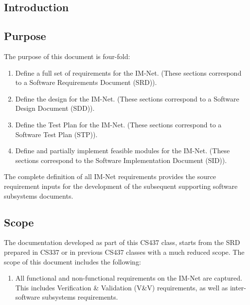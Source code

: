 \documentclass[letterpaper,12pt]{article}
\begin{document}
\tableofcontents
\listoffigures

\eject

{\textcolor{section}{\section{Introduction}}

\textcolor{subsection}{\subsection{Purpose}}

The purpose of this document is four-fold:

\begin{enumerate}
\item  Define a full set of requirements for the IM-Net. (These sections correspond to a Software Requirements Document (SRD)).

\item  Define the design for the IM-Net. (These sections correspond to a Software Design Document (SDD)).

\item  Define the Test Plan for the IM-Net. (These sections correspond to a Software Test Plan (STP)).

\item  Define and partially implement feasible modules for the IM-Net.  (These sections correspond to the Software Implementation Document (SID)).
\end{enumerate}

The complete definition of all IM-Net requirements provides the source requirement inputs for the development of the subsequent supporting software subsystems documents.

\textcolor{subsection}{\subsection{Scope}}

The documentation developed as part of this CS437 class, starts from the SRD prepared in CS337 or in previous CS437 classes with a much reduced scope.  The scope of this document includes the following:

\begin{enumerate}
\item  All functional and non-functional requirements on the IM-Net are captured.  This includes Verification \& Validation (V\&V) requirements, as well as inter-software subsystems requirements.


\end{enumerate}}
\end{document}

